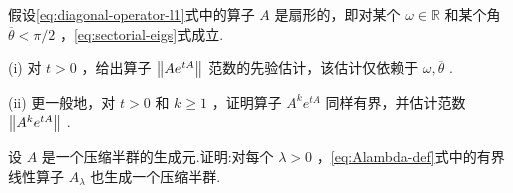 \begin{rbhw}[index=1]
假设\eqref{eq:diagonal-operator-l1}式中的算子 $A$ 是扇形的，即对某个 $\omega  \in  \mathbb{R}$ 和某个角 $\overline{\theta } < \pi /2$ ，\eqref{eq:sectorial-eigs}式成立.

(i) 对 $t > 0$ ，给出算子 $\norm{A{e}^{tA}}$ 范数的先验估计，该估计仅依赖于 $\omega ,\overline{\theta }$ .

(ii) 更一般地，对 $t > 0$ 和 $k \geq  1$ ，证明算子 ${A}^{k}{e}^{tA}$ 同样有界，并估计范数 $\norm{{A}^{k}{e}^{tA}}$ .

\end{rbhw}

\begin{rbhw}
设 $A$ 是一个压缩半群的生成元.证明:对每个 $\lambda  > 0$ ，\eqref{eq:Alambda-def}式中的有界线性算子 ${A}_{\lambda }$ 也生成一个压缩半群.

\end{rbhw}

